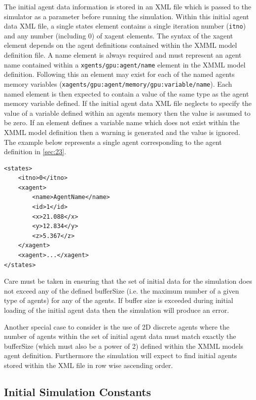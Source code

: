 \documentclass[11pt, a4paper, onecolumn, oneside]{report}
\begin{document}
The initial agent data information is stored in an XML file which is passed to the simulator as a parameter before running the simulation.
Within this initial agent data XML file, a single states element contains a single iteration number (\texttt{itno}) and any number (including 0) of xagent elements.
The syntax of the xagent element depends on the agent definitions contained within the XMML model definition file.
A name element is always required and must represent an agent name contained within a \texttt{xgents/gpu:agent/name} element in the XMML model definition.
Following this an element may exist for each of the named agents memory variables (\texttt{xagents/gpu:agent/memory/gpu:variable/name}).
Each named element is then expected to contain a value of the same type as the agent memory variable defined.
If the initial agent data XML file neglects to specify the value of a variable defined within an agents memory then the value is assumed to be zero.
If an element defines a variable name which does not exist within the XMML model definition then a warning is generated and the value is ignored.
The example below represents a single agent corresponding to the agent definition in \cref{sec:23}.

\begin{verbatim}
<states>
    <itno>0</itno>
    <xagent>
        <name>AgentName</name>
        <id>1</id>
        <x>21.088</x>
        <y>12.834</y>
        <z>5.367</z>
    </xagent>
    <xagent>...</xagent>
</states>
\end{verbatim}

Care must be taken in ensuring that the set of initial data for the simulation does not exceed any of the defined bufferSize (i.e. the maximum number of a given type of agents) for any of the agents.
If buffer size is exceeded during initial loading of the initial agent data then the simulation will produce an error.

Another special case to consider is the use of 2D discrete agents where the number of agents within the set of initial agent data must match exactly the bufferSize (which must also be a power of 2) defined within the XMML models agent definition.
Furthermore the simulation will expect to find initial agents stored within the XML file in row wise ascending order.

\subsection{Initial Simulation Constants}
\label{sec:271}
\end{document}
